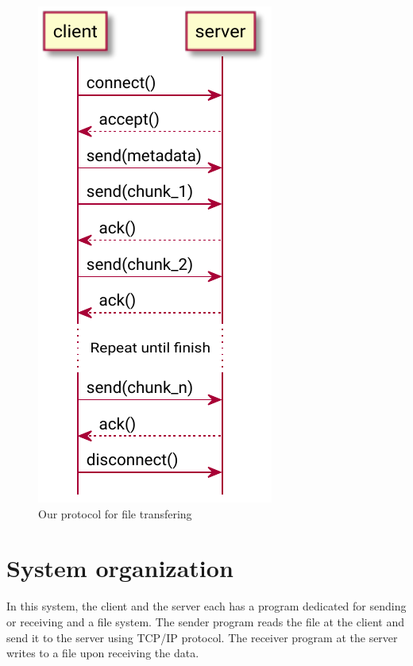 \documentclass{article}
\begin{document}
\begin{figure}
	\centering
	\includegraphics{pw1/protocol.pdf}
	\caption{Our protocol for file transfering}
\end{figure}

\section{System organization}

In this system, the client and the server each has a program dedicated for sending or receiving
and a file system. The sender program reads the file at the client and send it to the server
using TCP/IP protocol. The receiver program at the server writes to a file upon receiving the data.
\end{document}
